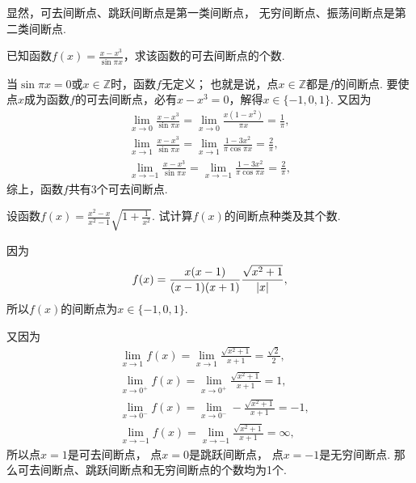显然，可去间断点、跳跃间断点是第一类间断点，
无穷间断点、振荡间断点是第二类间断点.

\begin{example}
已知函数\(f(x) = \frac{x-x^3}{\sin \pi x}\)，求该函数的可去间断点的个数.
\begin{solution}
当\(\sin \pi x = 0\)或\(x \in \mathbb{Z}\)时，函数\(f\)无定义；
也就是说，点\(x\in\mathbb{Z}\)都是\(f\)的间断点.
要使点\(x\)成为函数\(f\)的可去间断点，必有\(x-x^3=0\)，解得\(x\in\{-1,0,1\}\).
又因为\begin{gather*}
	\lim_{x\to0} \frac{x-x^3}{\sin \pi x}
	= \lim_{x\to0} \frac{x(1-x^2)}{\pi x}
	= \frac1\pi, \\
	\lim_{x\to1} \frac{x-x^3}{\sin \pi x}
	= \lim_{x\to1} \frac{1-3x^2}{\pi \cos \pi x}
	= \frac2\pi, \\
	\lim_{x\to-1} \frac{x-x^3}{\sin \pi x}
	= \lim_{x\to-1} \frac{1-3x^2}{\pi \cos \pi x}
	= \frac2\pi,
\end{gather*}
综上，函数\(f\)共有3个可去间断点.
\end{solution}
\end{example}

\begin{example}
设函数\(f(x) = \frac{x^2-x}{x^2-1}\sqrt{1+\frac{1}{x^2}}\).
试计算\(f(x)\)的间断点种类及其个数.
\begin{solution}
因为\[
	f(x) = \frac{x(x-1)}{(x-1)(x+1)} \frac{\sqrt{x^2+1}}{\abs{x}},
\]
所以\(f(x)\)的间断点为\(x\in\{-1,0,1\}\).

又因为\begin{align*}
	&\lim_{x\to1} f(x)
	= \lim_{x\to1} \frac{\sqrt{x^2+1}}{x+1}
	= \frac{\sqrt{2}}{2}, \\
	&\lim_{x\to0^+} f(x)
	= \lim_{x\to0^+} \frac{\sqrt{x^2+1}}{x+1}
	= 1, \\
	&\lim_{x\to0^-} f(x)
	= \lim_{x\to0^-} -\frac{\sqrt{x^2+1}}{x+1}
	= -1, \\
	&\lim_{x\to-1} f(x)
	= \lim_{x\to-1} \frac{\sqrt{x^2+1}}{x+1}
	= \infty,
\end{align*}
所以点\(x=1\)是可去间断点，
点\(x=0\)是跳跃间断点，
点\(x=-1\)是无穷间断点.
那么可去间断点、跳跃间断点和无穷间断点的个数均为1个.
\end{solution}
\end{example}

